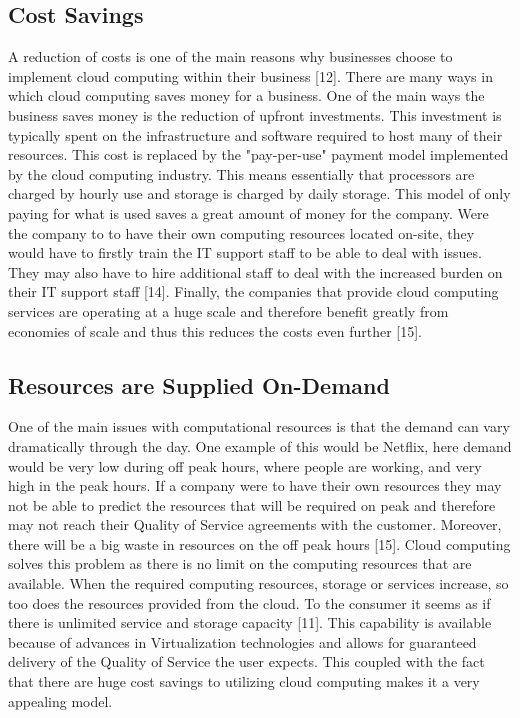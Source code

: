 \documentclass[oneside,12pt]{Classes/RoboticsLaTeX}
\begin{document}
\subsection{Cost Savings}
A reduction of costs is one of the main reasons why businesses choose to implement cloud computing within their business [12]. There are many ways in which cloud computing saves money for a business. One of the main ways the business saves money is the reduction of upfront investments. This investment is typically spent on the infrastructure and software required to host many of their resources. This cost is replaced by the "pay-per-use" payment model implemented by the cloud computing industry. This means essentially that processors are charged by hourly use and storage is charged by daily storage. This model of only paying for what is used saves a great amount of money for the company. Were the company to to have their own computing resources located on-site, they would have to firstly train the IT support staff to be able to deal with issues. They may also have to hire additional staff to deal with the increased burden on their IT support staff [14]. Finally, the companies that provide cloud computing services are operating at a huge scale and therefore benefit greatly from economies of scale and thus this reduces the costs even further [15]. 

\subsection{Resources are Supplied On-Demand}
One of the main issues with computational resources is that the demand can vary dramatically through the day. One example of this would be Netflix, here demand would be very low during off peak hours, where people are working, and very high in the peak hours. If a company were to have their own resources they may not be able to predict the resources that will be required on peak and therefore may not reach their Quality of Service agreements with the customer. Moreover, there will be a big waste in resources on the off peak hours [15]. Cloud computing solves this problem as there is no limit on the computing resources that are available. When the required computing resources, storage or services increase, so too does the resources provided from the cloud. To the consumer it seems as if there is unlimited service and storage capacity [11]. This capability is available because of advances in Virtualization technologies and allows for guaranteed delivery of the Quality of Service the user expects. This coupled with the fact that there are huge cost savings to utilizing cloud computing makes it a very appealing model. 
\end{document}
